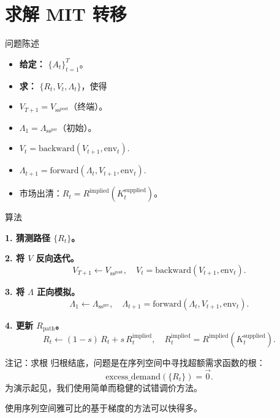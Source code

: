 \documentclass[10pt,aspectratio=169]{beamer}
\begin{document}
\section[求解 MIT 转移]{求解 MIT 转移}

\begin{frame}{问题陈述}
  \begin{itemize}
    \item \textbf{给定：} $\{A_t\}_{t = 1}^T$。
    \item \textbf{求：} $\{R_t, V_t, \Lambda_t\}$，使得
  \end{itemize}
  \begin{itemize}
    \item $V_{T+1} = V_{\mathrm{ss}^{\mathrm{post}}}$（终端）。
    \item $\Lambda_1 = \Lambda_{\mathrm{ss}^{\mathrm{pre}}}$（初始）。
    \item $V_t = \text{backward}(V_{t+1}, \mathrm{env}_t)$.
    \item $\Lambda_{t+1} = \text{forward}(\Lambda_t, V_{t+1}, \mathrm{env}_t)$.
    \item 市场出清：$R_t = R^{\mathrm{implied}}(K_t^{\mathrm{supplied}})$。
  \end{itemize}
\end{frame}

\begin{frame}{算法}

\textbf{1. 猜测路径 $\{R_t\}$。}

\textbf{2. 将 $V$ 反向迭代。}
\[
  V_{T+1} \leftarrow V_{\mathrm{ss}^{\mathrm{post}}}, \quad V_t = \text{backward}(V_{t+1}, \mathrm{env}_t).
\]

\textbf{3. 将 $\Lambda$ 正向模拟。}
\[
  \Lambda_1 \leftarrow \Lambda_{\mathrm{ss}^{\mathrm{pre}}}, \quad \Lambda_{t+1} = \text{forward}(\Lambda_t, V_{t+1}, \mathrm{env}_t).
\]

\textbf{4. 更新 $R_{\mathrm{path}}$。}
\[
  R_t \leftarrow (1 - s)\,R_t + s\,R_t^{\mathrm{implied}}, \quad R_t^{\mathrm{implied}} = R^{\mathrm{implied}}(K_t^{\mathrm{supplied}}).
\]

\end{frame}

\begin{frame}{注记：求根}
  归根结底，问题是在序列空间中寻找超额需求函数的根：
  \[
    \text{excess\_demand}(\{R_t\}) = \vec{0}.
  \]
  为演示起见，我们使用简单而稳健的试错调价方法。

  使用序列空间雅可比的基于梯度的方法可以快得多。
\end{frame}
\end{document}
